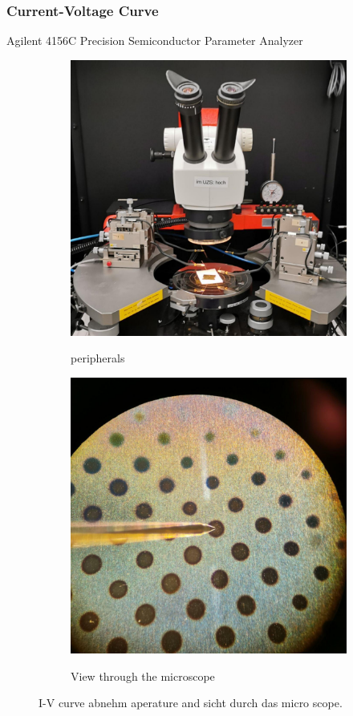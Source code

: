 \documentclass[a4paper]{article}
\begin{document}
\subsubsection{Current-Voltage Curve}
Agilent 4156C Precision Semiconductor Parameter Analyzer
\begin{figure}
	\centering
	\begin{subfigure}{0.48\textwidth}
		\centering
		\includegraphics[width=.9\textwidth]{Pics/i-v.png}
		\label{fig:iv-agilent}
		\caption{peripherals}
	\end{subfigure}
	\begin{subfigure}{0.48\textwidth}
		\centering
		\includegraphics[width=.9\textwidth]{Pics/i-v-micro.png}
		\label{fig:iv-micro}
		\caption{View through the microscope}
	\end{subfigure}
	\label{fig:iv}
	\caption{I-V curve abnehm aperature and sicht durch das micro scope.}
\end{figure}
\end{document}
